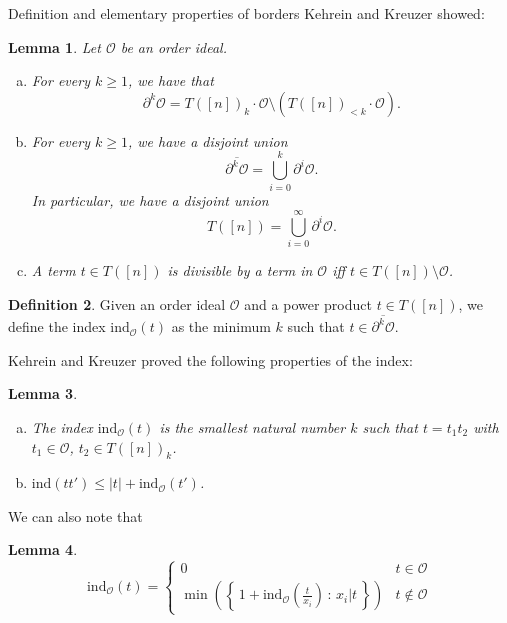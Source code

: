 \documentclass[reqno,a4paper,10pt]{amsart}
\theoremstyle{definition}
\newtheorem{definition}{Definition}
\theoremstyle{remark}
\theoremstyle{plain}
\newtheorem{lemma}[definition]{Lemma}
\newcommand\setsuchas[2]{\left\{\,{#1}\,:\,{#2}\,\right\}}
\newcommand{\tdeg}[1]{\lvert #1 \rvert}
\newcommand{\divides}[2]{{#1} \lvert {#2}}
\newcommand{\ind}{\mathrm{ind}}
\begin{document}
\begin{section}{Definition and elementary properties of borders}
Kehrein and Kreuzer \cite{KehKreu:CBB} showed:
  \begin{lemma}
    Let \(\mathcal{O}\) be an order ideal.
    \begin{enumerate}[(a)]
    \item For every \(k \ge 1\), we have that 
      \[\partial^k \mathcal{O}
      = T([n])_k \cdot \mathcal{O} \setminus \left( T([n])_{<k} \cdot
        \mathcal{O} \right).\]
    \item For every \(k \ge 1\), we have a disjoint union
      \begin{displaymath}
        \overline{\partial^k \mathcal{O}} = \bigcup_{i=0}^k \partial^i
        \mathcal{O}. 
      \end{displaymath}
      In particular, we have a disjoint union
      \begin{displaymath}
        T([n]) = \bigcup_{i=0}^\infty \partial^i \mathcal{O}.
      \end{displaymath}
    \item A term \(t \in T([n])\) is divisible by a term in
      \(\mathcal{O}\) iff \(t \in T([n]) \setminus \mathcal{O}\).
    \end{enumerate}
  \end{lemma}

  

  \begin{definition}
    Given an order ideal \(\mathcal{O}\) and a power product \(t \in
    T([n])\), we define the index \(\ind_{\mathcal{O}}(t)\) as
    the minimum \(k\) such that \(t \in \overline{\partial^{k}
      \mathcal{O}}\). 
  \end{definition}
  
  Kehrein and Kreuzer \cite{KehKreu:CBB} proved the following properties of the index:
  \begin{lemma}\label{lemma:Kehrein}
    \begin{enumerate}[(a)]
    \item The index \(\ind_{\mathcal{O}}(t)\) is the smallest natural
      number \(k\) such that \(t=t_1t_2\) with \(t_1 \in
      \mathcal{O}\), \(t_2 \in T([n])_k\).
    \item \(\ind(tt') \le \tdeg{t} + \ind_{\mathcal{O}}(t')\).
    \end{enumerate}
  \end{lemma}
  
  We can also note that
  \begin{lemma}
    \begin{equation}
      \label{eq:rec}
      \ind_{\mathcal{O}}(t) =
        \begin{cases}
          0 & t \in \mathcal{O} \\
          \min ( 
          \setsuchas{1+\ind_{\mathcal{O}}(\frac{t}{x_i})}{\divides{x_i}{t}}
          )
          &
          t \not \in \mathcal{O} 
        \end{cases}
    \end{equation}
  \end{lemma}



\end{section}
\end{document}
